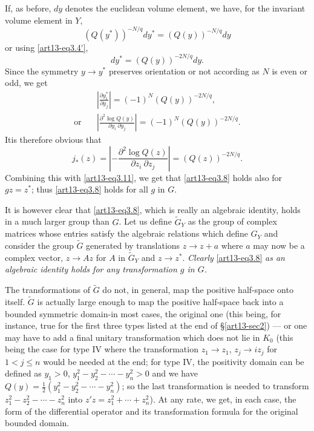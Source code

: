 If, as before, $dy$ denotes the euclidean volume element, we have, for the invariant volume element in $Y$,
$$
(Q(y^{*}))^{-N/q}dy^{*}=(Q(y))^{-N/q}dy
$$
or using \eqref{art13-eq3.4'},
$$
dy^{*}=(Q(y))^{-2N/q}dy.
$$
Since the symmetry $y\to y^{*}$ preserves orientation or not according as $N$ is even or odd, we get
\begin{align*}
&\left|\frac{\partial y_{i}^{*}}{\partial y_{j}}\right|=(-1)^{N}(Q(y))^{-2N/q},\\
\text{or}\quad & \left|\frac{\partial^{2}\log Q(y)}{\partial y_{i} \ \partial y_{j}}\right|=(-1)^{N}(Q(y))^{-2N/q}.
\end{align*}
It\pageoriginale is therefore obvious that
$$
j_{*}(z)=\left|-\dfrac{\partial^{2}\log Q(z)}{\partial z_{i} \ \partial z_{j}}\right|=(Q(z))^{-2N/q}.
$$
Combining this with \eqref{art13-eq3.11}, we get that \eqref{art13-eq3.8} holds also for $gz=z^{*}$; thus \eqref{art13-eq3.8} holds for all $g$ in $G$.

It is however clear that \eqref{art13-eq3.8}, which is really an algebraic identity, holds in a much larger group than $G$. Let us define $\widetilde{G}_{Y}$ as the group of complex matrices whose entries satisfy the algebraic relations which define $G_{Y}$ and consider the group $\widetilde{G}$ generated by translations $z\to z+a$ where $a$ may now be a complex vector, $z\to Az$ for $A$ in $\widetilde{G}_{Y}$ and $z\to z^{*}$. {\em Clearly} \eqref{art13-eq3.8} {\em as an algebraic identity holds for any transformation $g$ in $G$.}

The transformations of $\widetilde{G}$ do not, in general, map the positive half-space onto itself. $\widetilde{G}$ is actually large enough to map the positive half-space back into a bounded symmetric domain-in most cases, the original one (this being, for instance, true for the first three types listed at the end of \S\ref{art13-sec2}) --- or one may have to add a final unitary transformation which does not lie in $K_{0}$ (this being the case for type IV where the transformation $z_{1}\to z_{1}$, $z_{j}\to iz_{j}$ for $1<j\leq n$ would be needed at the end; for type IV, the positivity domain can be defined as $y_{1}>0$, $y^{2}_{1}-y^{2}_{2}-\cdots-y^{2}_{n}>0$ and we have $Q(y)=\frac{1}{2}(y^{2}_{1}-y^{2}_{2}-\cdots-y^{2}_{n})$; so the last transformation is needed to transform $z^{2}_{1}-z^{2}_{2}-\cdots-z^{2}_{n}$ into $z'z=z^{2}_{1}+\cdots+z^{2}_{n}$). At any rate, we get, in each case, the form of the differential operator and its transformation formula for the original bounded domain.

